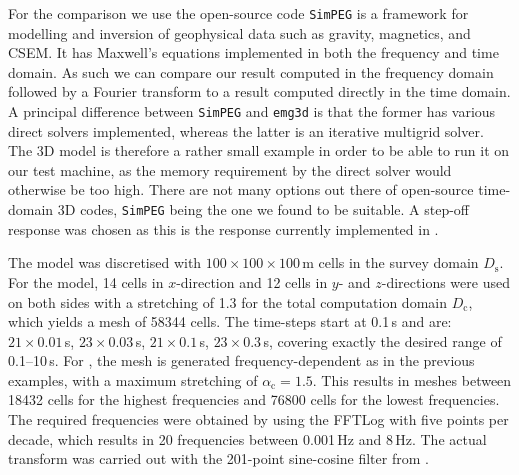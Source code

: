 \documentclass[
    manuscript,
    revised,
  ]{geophysics}
\newcommand{\mr}[1]{\mathrm{#1}}
\newcommand{\emg}[2]{\texttt{emg#1#2}\xspace}
\newcommand{\simpeg}{\texttt{SimPEG}\xspace}
\begin{document}
For the comparison we use the open-source code \simpeg
\citep{CAG.15.Cockett}\old{. \simpeg} is a framework for modelling
and inversion of geophysical data such as gravity, magnetics, and CSEM. It has
Maxwell's equations implemented in both the frequency and time domain. As such
we can compare our result computed in the frequency domain followed by a
Fourier transform to a result computed directly in the time domain. A principal
difference between \simpeg and \emg3d is that the former has various direct
solvers implemented, whereas the latter is an iterative multigrid solver. The
3D model is therefore a rather small example in order to be able to run it on
our test machine, as the memory requirement by the direct solver would
otherwise be too high. There are not many options out there of open-source
time-domain 3D codes, \simpeg being the one we found to be suitable. A step-off
response was chosen as this is the response currently implemented in \old{\simpeg}.

The model was discretised with $100\times100\times100\,$m cells in the survey
domain $D_\mr{s}$. For the \old{\simpeg} model, 14 cells in
$x$-direction and 12 cells in $y$- and $z$-directions were used on both sides
with a stretching of 1.3 for the total computation domain $D_\mr{c}$, which
yields a mesh of \num{58344} cells. The time-steps start at 0.1\,s and are:
$21\times0.01\,$s, $23\times0.03\,$s, $21\times0.1\,$s, $23\times0.3\,$s,
covering exactly the desired range of 0.1--10\,s. For
\old{\emg3d}, the mesh is generated
frequency-dependent as in the previous examples, with a maximum stretching of
$\alpha_\mr{c}=1.5$. This results in meshes between \num{18432} cells for the
highest frequencies and \num{76800} cells for the lowest frequencies. The
required frequencies were obtained by using the FFTLog with five points per
decade, which results in 20 frequencies between 0.001\,Hz and 8\,Hz. The actual
transform was carried out with the 201-point sine-cosine filter from
\cite{GEO.09.Key}.
\end{document}
